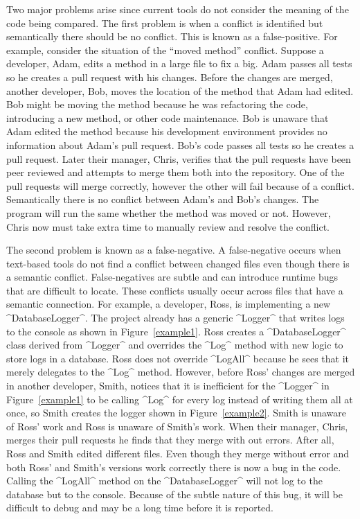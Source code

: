 \documentclass[draftclsnofoot,onecolumn]{IEEEtran}
\begin{document}
Two major problems arise since current tools do not consider the meaning of 
the code being compared. The first problem is when a conflict is identified 
but semantically there should be no conflict. This is known as a 
false-positive. For example, consider the situation of the ``moved method'' 
conflict. Suppose a developer, Adam, edits a method in a large file to fix a 
big. Adam passes all tests so he creates a pull request with his changes. 
Before the changes are merged, another developer, Bob, moves the location of 
the method that Adam had edited. Bob might be moving the method because he was 
refactoring the code, introducing a new method, or other code maintenance. Bob 
is unaware that Adam edited the method because his development environment 
provides no information about Adam's pull request. Bob's code passes all tests 
so he creates a pull request. Later their manager, Chris, verifies that the 
pull requests have been peer reviewed and attempts to merge them both into the 
repository. One of the pull requests will merge correctly, however the other 
will fail because of a conflict. Semantically there is no conflict between 
Adam's and Bob's changes. The program will run the same whether the method was 
moved or not. However, Chris now must take extra time to manually review and 
resolve the conflict.

The second problem is known as a false-negative. A false-negative occurs when 
text-based tools do not find a conflict between changed files even though 
there is a semantic conflict. False-negatives are subtle and can introduce 
runtime bugs that are difficult to locate. These conflicts usually occur 
across files that have a semantic connection. For example, a developer, Ross, 
is implementing a new ^DatabaseLogger^. The project already has a generic 
^Logger^ that writes logs to the console as shown in Figure~\ref{example1}. 
Ross creates a ^DatabaseLogger^ class derived from ^Logger^ and overrides the 
^Log^ method with new logic to store logs in a database. Ross does not override 
^LogAll^ because he sees that it merely delegates to the ^Log^ method. 
However, before Ross' changes are merged in another developer, Smith, notices 
that it is inefficient for the ^Logger^ in Figure~\ref{example1} to be calling 
^Log^ for every log instead of writing them all at once, so Smith creates the 
logger shown in Figure~\ref{example2}. Smith is unaware of Ross' work and Ross 
is unaware of Smith's work. When their manager, Chris, merges their pull 
requests he finds that they merge with out errors. After all, Ross and Smith 
edited different files. Even though they merge without error and both Ross' 
and Smith's versions work correctly there is now a bug in the code. Calling 
the ^LogAll^ method on the ^DatabaseLogger^ will not log to the database but 
to the console. Because of the subtle nature of this bug, it will be difficult 
to debug and may be a long time before it is reported.
\end{document}
